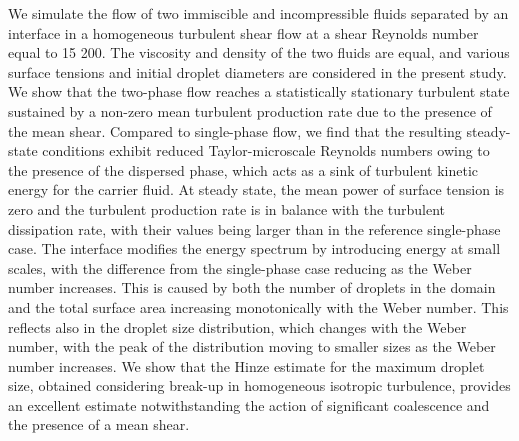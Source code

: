 \begin{paper}

\makepapertitle

%
\begin{paperabstract}
We  simulate  the  flow  of  two  immiscible  and  incompressible  fluids  separated  by  an interface  in  a  homogeneous  turbulent  shear  flow  at  a  shear  Reynolds  number  equal to  15 200.  The  viscosity  and  density  of  the  two  fluids  are  equal,  and  various  surface tensions  and  initial  droplet  diameters  are  considered  in  the  present  study.  We  show that  the  two-phase  flow  reaches  a  statistically  stationary  turbulent  state  sustained  by a  non-zero  mean  turbulent  production  rate  due  to  the  presence  of  the  mean  shear. Compared  to  single-phase  flow,  we  find  that  the  resulting  steady-state  conditions exhibit  reduced  Taylor-microscale  Reynolds  numbers  owing  to  the  presence  of  the dispersed  phase,  which  acts  as  a  sink  of  turbulent  kinetic  energy  for  the  carrier  fluid. At steady state, the mean power of surface tension is zero and the turbulent production rate  is  in  balance  with  the  turbulent  dissipation  rate,  with  their  values  being  larger than  in  the  reference  single-phase  case.  The  interface  modifies  the  energy  spectrum by  introducing  energy  at  small  scales,  with  the  difference  from  the  single-phase  case reducing  as  the  Weber  number  increases.  This  is  caused  by  both  the  number  of droplets  in  the  domain  and  the  total  surface  area  increasing  monotonically  with  the Weber  number.  This  reflects  also  in  the  droplet  size  distribution,  which  changes  with the  Weber  number,  with  the  peak  of  the  distribution  moving  to  smaller  sizes  as  the Weber  number  increases.  We  show  that  the  Hinze  estimate  for  the  maximum  droplet size,  obtained  considering  break-up  in  homogeneous  isotropic  turbulence,  provides an  excellent  estimate  notwithstanding  the  action  of  significant  coalescence  and  the presence  of  a  mean  shear.
\end{paperabstract}


%



%


%

\end{paper}
